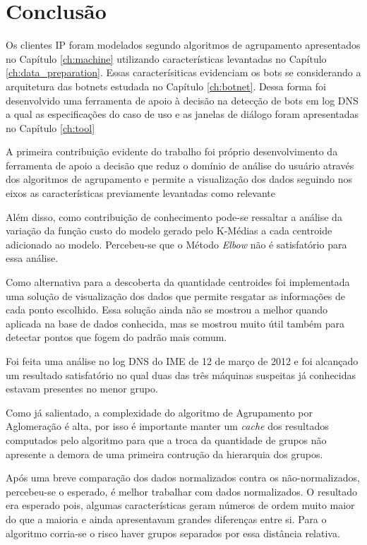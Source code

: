 \chapter{Conclusão}

Os clientes IP foram modelados segundo algoritmos de agrupamento apresentados no Capítulo \ref{ch:machine} utilizando características levantadas no Capítulo \ref{ch:data_preparation}. Essas caracterísiticas evidenciam os bots se considerando a arquitetura das botnets estudada no Capítulo \ref{ch:botnet}. Dessa forma foi desenvolvido uma ferramenta de apoio à decisão na detecção de bots em log DNS a qual as especificações do caso de uso e as janelas de diálogo foram apresentadas no Capítulo \ref{ch:tool}

A primeira contribuição evidente do trabalho foi próprio desenvolvimento da ferramenta de apoio a decisão que reduz o domínio de análise do usuário através dos algoritmos de agrupamento e permite a visualização dos dados seguindo nos eixos as características previamente levantadas como relevante

Além disso, como contribuição de conhecimento pode-se ressaltar a análise da variação da função custo do modelo gerado pelo K-Médias a cada centroide adicionado ao modelo. Percebeu-se que o Método \textit{Elbow} não é satisfatório para essa análise.

Como alternativa para a descoberta da quantidade centroides foi implementada uma solução de visualização dos dados que permite resgatar as informações de cada ponto escolhido. Essa solução ainda não se mostrou a melhor quando aplicada na base de dados conhecida, mas se mostrou muito útil também para detectar pontos que fogem do padrão mais comum.

Foi feita uma análise no log DNS do IME de 12 de março de 2012 e foi alcançado um resultado satisfatório no qual duas das três máquinas suspeitas já conhecidas estavam presentes no menor grupo.

Como já salientado, a complexidade do algoritmo de Agrupamento por Aglomeração é alta, por isso é importante manter um \textit{cache} dos resultados computados pelo algoritmo para que a troca da quantidade de grupos não apresente a demora de uma primeira contrução da hierarquia dos grupos.

Após uma breve comparação dos dados normalizados contra os não-normalizados, percebeu-se o esperado, é melhor trabalhar com dados normalizados. O resultado era esperado pois, algumas características geram números de ordem muito maior do que a maioria e ainda apresentavam grandes diferenças entre si. Para o algoritmo corria-se o risco haver grupos separados por essa distância relativa.


